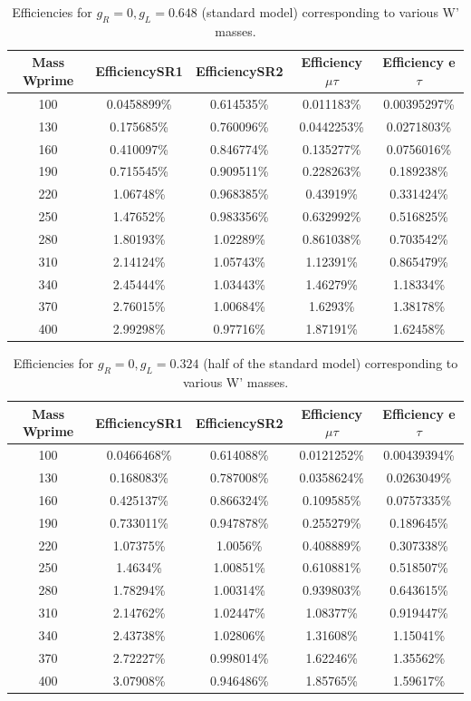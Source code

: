   \begin{table}[htb]
 	\centering
  	\begin{tabular}{|ccccc|}
  		\hline 
  		Mass Wprime & EfficiencySR1 & EfficiencySR2 & Efficiency $\mu$$\tau$ & Efficiency e $\tau$ \\
\hline 
  		100& 0.0458899\%& 0.614535\%& 0.011183\% & 0.00395297\%\\
 		130& 0.175685\%& 0.760096\%& 0.0442253\%& 0.0271803\%\\
  		160& 0.410097\%& 0.846774\%& 0.135277\%& 0.0756016\%\\
  		190& 0.715545\%& 0.909511\%& 0.228263\%& 0.189238\%\\
  		220& 1.06748\%& 0.968385\%& 0.43919\%& 0.331424\%\\
  		250& 1.47652\%& 0.983356\%& 0.632992\%& 0.516825\%\\ 
  		280& 1.80193\%& 1.02289\%& 0.861038\%& 0.703542\%\\
 		310& 2.14124\%& 1.05743\%& 1.12391\%& 0.865479\%\\
  		340& 2.45444\%& 1.03443\%& 1.46279\%& 1.18334\%\\ 
  		370& 2.76015\%& 1.00684\%& 1.6293\%& 1.38178\%\\
  		400& 2.99298\%& 0.97716\%& 1.87191\%& 1.62458\%\\

  		\hline
  	\end{tabular}
  	\caption{Efficiencies for $ g_R=0 , g_L=0.648 $ (standard model) corresponding to various W' masses. \label{eff-SM} }
  \end{table}


   \begin{table}[htb]
 	\centering
  	\begin{tabular}{|ccccc|}
  		\hline 
  		Mass Wprime  & EfficiencySR1  & EfficiencySR2 & Efficiency $\mu$$\tau$ & Efficiency e $\tau$ \\
                \hline 
100& 0.0466468\%& 0.614088\%& 0.0121252\%& 0.00439394\%\\
130& 0.168083\%& 0.787008\%& 0.0358624\%& 0.0263049\%\\
160& 0.425137\%& 0.866324\%& 0.109585\%& 0.0757335\%\\
190& 0.733011\%& 0.947878\%& 0.255279\%& 0.189645\%\\
220& 1.07375\%& 1.0056\%& 0.408889\%& 0.307338\%\\
250& 1.4634\%& 1.00851\%& 0.610881\%& 0.518507\%\\
280& 1.78294\%& 1.00314\%& 0.939803\%& 0.643615\%\\
310& 2.14762\%& 1.02447\%& 1.08377\%& 0.919447\%\\
340& 2.43738\%& 1.02806\%& 1.31608\%& 1.15041\%\\
370& 2.72227\%& 0.998014\%& 1.62246\%& 1.35562\%\\
400& 3.07908\%& 0.946486\%& 1.85765\%& 1.59617\%\\
  	
  	\hline
  	\end{tabular}
  	\caption{Efficiencies for $ g_R=0 , g_L=0.324 $ (half of the standard model) corresponding to various W' masses. \label{eff-half} }
  \end{table}
 

